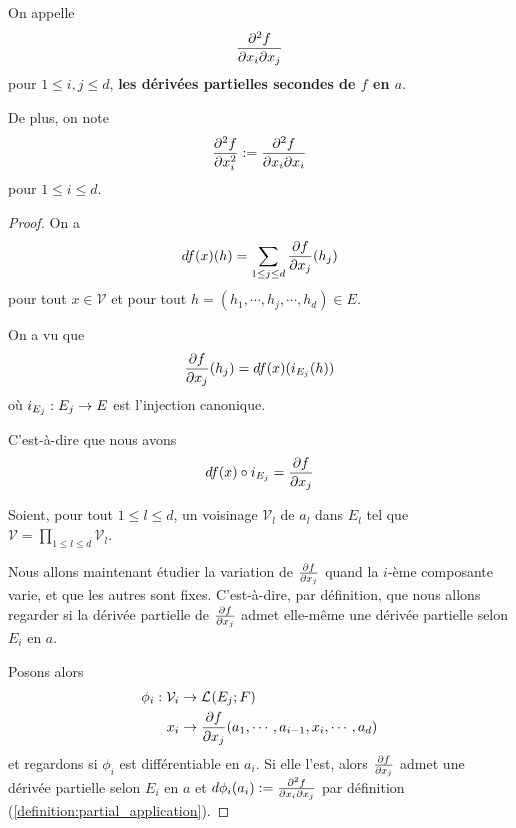 On appelle 
\begin{equation*}
	\pdv{f}{x_{i}}{x_{j}} (a)
\end{equation*}
pour $1 \leq i, j \leq d$, \textbf{les dérivées partielles secondes de $f$ en $a$}.

De plus, on note
\begin{equation*}
	\pdv[2]{f}{x_{i}} (a) := \pdv{f}{x_{i}}{x_{i}} (a)
\end{equation*}
pour $1 \leq i \leq d$.

\ifdefined\outputproof
\begin{proof}
	On a
	\begin{equation}
		df(x) (h) = \sum_{1 \leq j \leq d} \pdv{f}{x_{j}} (x) (h_{j})
	\end{equation}
	pour tout $x \in \mathcal{V}$ et pour tout $h = (h_{1}, \cdots, h_{j},
	\cdots, h_{d}) \in E$.

	On a vu que
	\begin{equation}
		\pdv{f}{x_{j}} (x) (h_{j}) = df (x) (i_{E_{j}} (h))
	\end{equation}
	où $i_{E_{j}} : E_{j} \rightarrow E$ est l'injection canonique.

	C'est-à-dire que nous avons
	\begin{equation}
		df (x) \circ i_{E_{j}} = \pdv{f}{x_{j}} (x)
	\end{equation}

	Soient, pour tout $1 \leq l \leq d$, un voisinage $\mathcal{V}_{l}$ de $a_{l}$ dans
	$E_{l}$ tel que $\mathcal{V} = \displaystyle \prod_{1 \leq l \leq d}
	\mathcal{V}_{l}$.

	Nous allons maintenant étudier la variation de $\pdv{f}{x_{j}} (a)$ quand la
	$i$-ème composante varie, et que les autres sont fixes. C'est-à-dire, par
	définition, que nous allons regarder si la dérivée partielle de
	$\pdv{f}{x_{j}}$ admet elle-même une dérivée partielle selon $E_{i}$ en $a$.

	Posons alors
	\begin{align}
		\phi_{i} : \mathcal{V}_{i} & \rightarrow \mathcal{L}_{}(E_{j}; F) \\
					x_{i} &\rightarrow \pdv{f}{x_{j}} (a) (a_{1}, \cdots, a_{i - 1},
					x_{i}, \cdots, a_{d})
	\end{align}
	et regardons si $\phi_{i}$ est différentiable en $a_{i}$. Si elle l'est,
	alors $\pdv{f}{x_{j}} (a)$ admet une dérivée partielle selon $E_{i}$ en $a$
	et $d\phi_{i} (a_{i}) := \pdv{f}{x_{i}}{x_{j}} (a)$ par définition
	(\ref{definition:partial_application}).


\end{proof}
